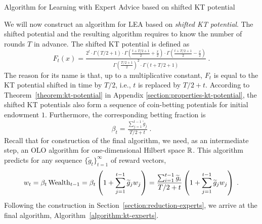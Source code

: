 \begin{algorithm}[t]
\begin{algorithmic}[1]
\caption{Algorithm for Learning with Expert Advice based on shifted KT potential
\label{algorithm:kt-experts}}
{
\ENDFOR
}
\end{algorithmic}
\end{algorithm}

We will now construct an algorithm for \ac{LEA} based on \emph{shifted KT
potential}. The shifted potential and the resulting algorithm requires to know
the number of rounds $T$ in advance. The shifted KT potential is defined as
\[
F_t(x) = \tfrac{2^t \cdot \Gamma\left(T/2 + 1 \right) \cdot \Gamma\left(\tfrac{t+T/2+1}{2} + \frac{x}{2} \right) \cdot \Gamma\left(\tfrac{t+T/2+1}{2} - \frac{x}{2} \right)}{\Gamma\left(\tfrac{T/2+1}{2} \right)^2 \cdot \Gamma \left(t+T/2+1\right)} \; .
\]
The reason for its name is that, up to a multiplicative constant, $F_t$ is
equal to the KT potential shifted in time by $T/2$, i.e., $t$ is replaced by
$T/2+t$.  According to Theorem~\ref{theorem:kt-potential} in Appendix
\ref{section:properties-kt-potential}, the shifted KT potentials also form a
sequence of coin-betting potentials for initial endowment $1$. Furthermore, the
corresponding betting fraction is
\[
\beta_t = \tfrac{\sum_{j=1}^{t-1} \widetilde g_j}{T/2+t} \; .
\]
Recall that for construction of the final algorithm, we need, as an
intermediate step, an OLO algorithm for one-dimensional Hilbert space $\mathbb{R}$.
This algorithm predicts for any sequence $\{\widetilde g_t\}_{t=1}^\infty$ of reward
vectors,
\[
w_t
= \beta_t \operatorname{Wealth}_{t-1}
= \beta_t \left(1 + \sum_{j=1}^{t-1} \widetilde g_j w_j \right)
= \frac{\sum_{i=1}^{t-1} \widetilde g_i}{T/2+t} \left(1 + \sum_{j=1}^{t-1} \widetilde g_j w_j \right) \; .
\]
Following the construction in Section~\ref{section:reduction-experts}, we
arrive at the final algorithm, Algorithm~\ref{algorithm:kt-experts}.

